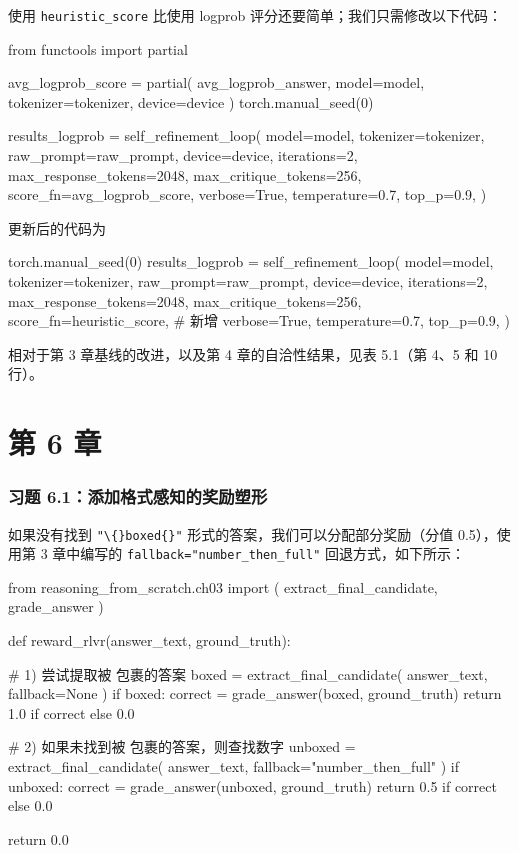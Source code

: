 使用 \texttt{heuristic\_score} 比使用 logprob 评分还要简单；我们只需修改以下代码：

\begin{codebox}
from functools import partial

avg_logprob_score = partial(
    avg_logprob_answer,
    model=model,
    tokenizer=tokenizer,
    device=device
)
torch.manual_seed(0)

results_logprob = self_refinement_loop(
    model=model,
    tokenizer=tokenizer,
    raw_prompt=raw_prompt,
    device=device,
    iterations=2,
    max_response_tokens=2048,
    max_critique_tokens=256,
    score_fn=avg_logprob_score,
    verbose=True,
    temperature=0.7,
    top_p=0.9,
)
\end{codebox}

更新后的代码为

\begin{codebox}
torch.manual_seed(0)
results_logprob = self_refinement_loop(
    model=model,
    tokenizer=tokenizer,
    raw_prompt=raw_prompt,
    device=device,
    iterations=2,
    max_response_tokens=2048,
    max_critique_tokens=256,
    score_fn=heuristic_score,  # 新增
    verbose=True,
    temperature=0.7,
    top_p=0.9,
)
\end{codebox}

相对于第 3 章基线的改进，以及第 4 章的自洽性结果，见表 5.1（第 4、5 和 10 行）。

\section{第 6 章}

\subsubsection*{习题 6.1：添加格式感知的奖励塑形}

如果没有找到 \texttt{"}\texttt{\textbackslash\{\}boxed\{\}}\texttt{"} 形式的答案，我们可以分配部分奖励（分值 0.5），使用第 3 章中编写的 \texttt{fallback=}\texttt{"}\texttt{number\_then\_full}\texttt{"} 回退方式，如下所示：

\begin{codebox}
from reasoning_from_scratch.ch03 import (
    extract_final_candidate, grade_answer
)

def reward_rlvr(answer_text, ground_truth):

    # 1) 尝试提取被 \boxed{} 包裹的答案
    boxed = extract_final_candidate(
        answer_text, fallback=None
    )
    if boxed:
        correct = grade_answer(boxed, ground_truth)
        return 1.0 if correct else 0.0

    # 2) 如果未找到被 \boxed{} 包裹的答案，则查找数字
    unboxed = extract_final_candidate(
        answer_text, fallback="number_then_full"
    )
    if unboxed:
        correct = grade_answer(unboxed, ground_truth)
        return 0.5 if correct else 0.0

    return 0.0
\end{codebox}

